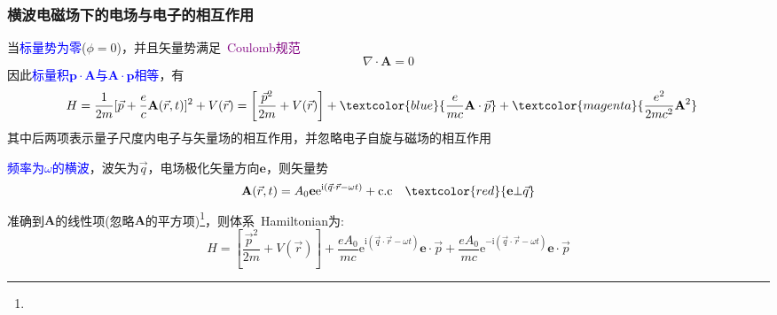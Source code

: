 \frame
{
	\frametitle{横波电磁场下的电场与电子的相互作用}
	当\textcolor{blue}{标量势为零}($\phi=0$)，并且矢量势满足~\textcolor{purple}{\textrm{Coulomb}规范}
	\begin{displaymath}
		\nabla\cdot\mathbf{A}=0
	\end{displaymath}
	因此\textcolor{blue}{标量积$\mathbf{p}\cdot\mathbf{A}$与$\mathbf{A}\cdot\mathbf{p}$相等}，有
\begin{displaymath}
	\hspace*{-10pt}
	H=\frac1{2m}[\vec p+\frac{e}c\mathbf{A}(\vec r,t)]^2+V(\vec r)=\left[ \frac{\vec p^2}{2m}+V(\vec r) \right]+\textcolor{blue}{\frac{e}{mc}\mathbf{A}\cdot\vec p}+\textcolor{magenta}{\frac{e^2}{2mc^2}\mathbf{A}^2}
\end{displaymath}
其中后两项表示量子尺度内电子与矢量场的相互作用，并忽略电子自旋与磁场的相互作用

\textcolor{blue}{频率为$\omega$的横波}，波矢为$\vec q$，电场极化矢量方向$\mathbf{e}$，则矢量势
\begin{displaymath}
	\mathbf{A}(\vec r,t)=A_0\mathbf{e}\mathrm{e}^{\mathrm{i}(\vec q\cdot\vec r-\omega t)}+\mathrm{c.c}\quad\textcolor{red}{\mathbf{e}\bot\vec q}
\end{displaymath}
准确到$\mathbf{A}$的线性项(忽略$\mathbf{A}$的平方项)\footnote{\fontsize{5.2pt}{4.0pt}\selectfont{偶极近似下，这是合理的近似}}，则体系~\textrm{Hamiltonian}为:
\begin{displaymath}
	H=\left[ \frac{\vec p^2}{2m}+V(\vec r) \right]+\frac{eA_0}{mc}\mathrm{e}^{\mathrm{i}(\vec q\cdot\vec r-\omega t)}\mathbf{e}\cdot\vec p+\frac{eA_0}{mc}\mathrm{e}^{-\mathrm{i}(\vec q\cdot\vec r-\omega t)}\mathbf{e}\cdot\vec p
\end{displaymath}
}

